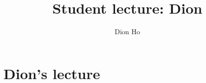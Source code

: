 \documentclass[11pt,reqno,oneside,a4paper]{article}
\title{Student lecture: Dion}
\author{Dion Ho}
\begin{document}

\maketitle
\thispagestyle{fancy}


\section{Dion's lecture} \label{sec:Dion}

\end{document}
